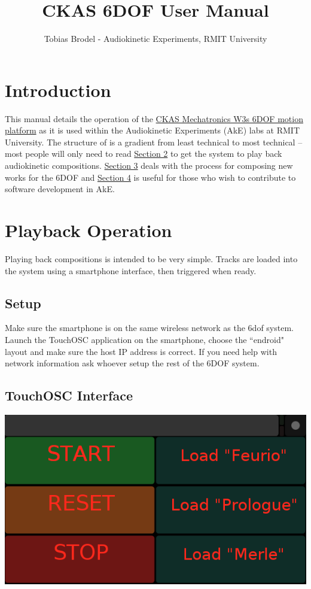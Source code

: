 \documentclass{article}
\title{CKAS 6DOF User Manual}
\author{Tobias Brodel - Audiokinetic Experiments, RMIT University}
\begin{document}
	\maketitle
	\newpage

	\tableofcontents
	\newpage

	\section{Introduction}
	This manual details the operation of the 
	\href{http://www.ckas.com.au/6dof_low_cost_systems_62.html}{CKAS 
	Mechatronics W3s 6DOF motion platform} as it is used within the 
	Audiokinetic Experiments (AkE) labs at RMIT University. The structure of is 	a gradient from least technical to most technical -- most people will only 
	need to read \hyperref[playback]{Section 2} to get the system to play back 
	audiokinetic compositions. \hyperref[comp]{Section 3} deals with the 
	process for composing new works for the 6DOF and \hyperref[dev]{Section 4} 
	is useful for those who wish to contribute to software development in AkE.

	\section{Playback Operation}
	\label{playback}
	Playing back compositions is intended to be very simple. Tracks are loaded 
	into the system using a smartphone interface, then triggered when ready. 

	\subsection{Setup}
	Make sure the smartphone is on the same wireless network as the 6dof 
	system. Launch the TouchOSC application on the smartphone, choose the 
	``endroid" layout and make sure the host IP address is correct. If you need 
	help with network information ask whoever setup the rest of the 6DOF system.

	\subsection{TouchOSC Interface}
	\includegraphics[width=\linewidth]{img/touchOSC.png}
\end{document}

